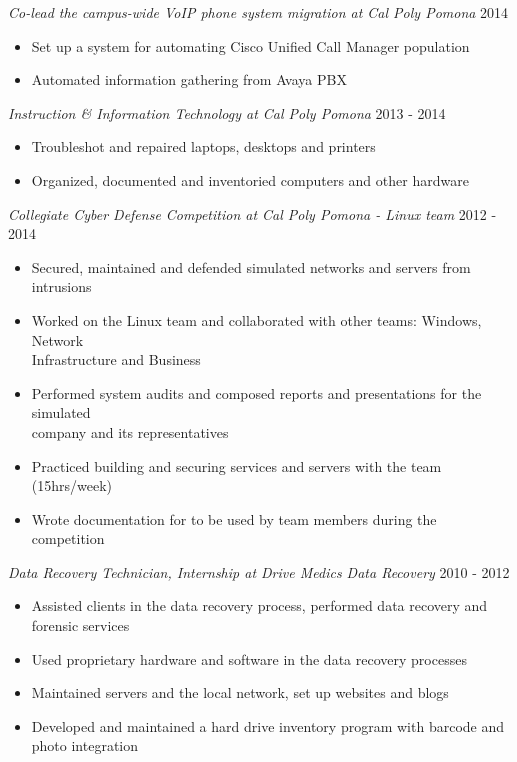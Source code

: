 \documentclass[line]{docs/resume/res}
\begin{document}
\begin{resume}
\begin{itemize}
  {\sl Co-lead the campus-wide VoIP phone system migration at Cal Poly Pomona} \hfill 2014
  \begin{itemize} \itemsep -2pt
    \item Set up a system for automating Cisco Unified Call Manager population
    \item Automated information gathering from Avaya PBX
  \end{itemize}

  {\sl Instruction \& Information Technology at Cal Poly Pomona} \hfill 2013 - 2014
  \begin{itemize} \itemsep -2pt
    \item Troubleshot and repaired laptops, desktops and printers
    \item Organized, documented and inventoried computers and other hardware
  \end{itemize}

  {\sl Collegiate Cyber Defense Competition at Cal Poly Pomona - Linux team} \hfill 2012 - 2014
  \begin{itemize} \itemsep -2pt
    \item Secured, maintained and defended simulated networks and servers from intrusions
    \item Worked on the Linux team and collaborated with other teams: Windows, Network \\
      Infrastructure and Business
    \item Performed system audits and composed reports and presentations for the simulated \\
      company and its representatives
    \item Practiced building and securing services and servers with the team (15hrs/week)
    \item Wrote documentation for to be used by team members during the competition
  \end{itemize}

  {\sl Data Recovery Technician, Internship at Drive Medics Data Recovery} \hfill 2010 - 2012
  \begin{itemize} \itemsep -2pt
    \item Assisted clients in the data recovery process, performed data recovery and \\
      forensic services
    \item Used proprietary hardware and software in the data recovery processes
    \item Maintained servers and the local network, set up websites and blogs
    \item Developed and maintained a hard drive inventory program with barcode and \\
      photo integration
  \end{itemize}


\end{itemize}
\end{resume}
\end{document}
